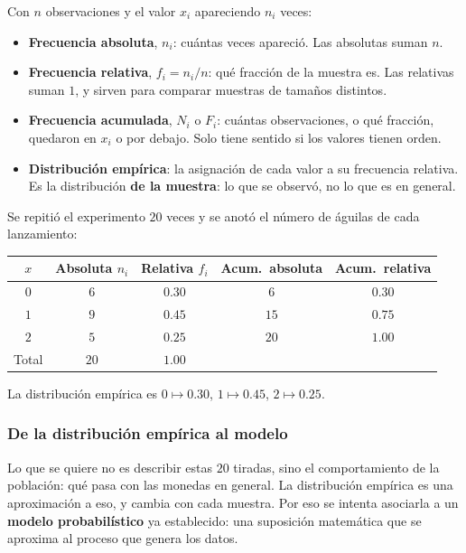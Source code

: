\documentclass[11pt,letterpaper]{article}
\begin{document}
Con $n$ observaciones y el valor $x_i$ apareciendo $n_i$ veces:

\begin{itemize}[itemsep=0.3em]
    \item \textbf{Frecuencia absoluta}, $n_i$: cuántas veces apareció.
          Las absolutas suman $n$.
    \item \textbf{Frecuencia relativa}, $f_i = n_i / n$: qué fracción
          de la muestra es. Las relativas suman $1$, y sirven para
          comparar muestras de tamaños distintos.
    \item \textbf{Frecuencia acumulada}, $N_i$ o $F_i$: cuántas
          observaciones, o qué fracción, quedaron en $x_i$ o por
          debajo. Solo tiene sentido si los valores tienen orden.
    \item \textbf{Distribución empírica}: la asignación de cada valor a
          su frecuencia relativa. Es la distribución \textbf{de la
          muestra}: lo que se observó, no lo que es en general.
\end{itemize}

\begin{ejemplo}
    Se repitió el experimento $20$ veces y se anotó el número de
    águilas de cada lanzamiento:
    \begin{center}
    \begin{tabular}{ccccc}
        \toprule
        $x$ & \textbf{Absoluta} $n_i$ & \textbf{Relativa} $f_i$
        & \textbf{Acum.\ absoluta} & \textbf{Acum.\ relativa} \\
        \midrule
        $0$ & $6$ & $0.30$ & $6$  & $0.30$ \\
        $1$ & $9$ & $0.45$ & $15$ & $0.75$ \\
        $2$ & $5$ & $0.25$ & $20$ & $1.00$ \\
        \midrule
        Total & $20$ & $1.00$ & & \\
        \bottomrule
    \end{tabular}
    \end{center}
    La distribución empírica es $0 \mapsto 0.30$, $1 \mapsto 0.45$,
    $2 \mapsto 0.25$.
\end{ejemplo}

\subsubsection*{De la distribución empírica al modelo}

Lo que se quiere no es describir estas $20$ tiradas, sino el
comportamiento de la población: qué pasa con las monedas en general.
La distribución empírica es una aproximación a eso, y cambia con cada
muestra. Por eso se intenta asociarla a un \textbf{modelo
probabilístico} ya establecido: una suposición matemática que se
aproxima al proceso que genera los datos.
\end{document}
